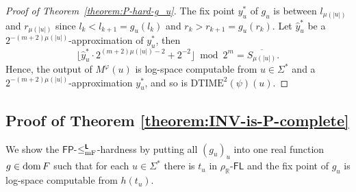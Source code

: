\documentclass[envcountsect,envcountsame,orivec,oribibl]{llncs}
\newcommand{\R}{\mathbb R}
\newcommand{\classonefont}[1]{\mathsf{#1}}
\newcommand{\classFL}{\classonefont{FL}}
\newcommand{\classFP}{\classonefont{FP}}
\newcommand{\classtwofont}[1]{\text{\bfseries \sffamily \upshape #1}}
\newcommand{\classLtwo}{\classtwofont{L}}
\newcommand{\rhoR}{\rho _\R}
\newcommand{\redmF}{\leq _{\mathrm{mF}}}
\newcommand{\redLmF}{\redmF ^{\classLtwo}}
\newcommand{\probDTIMEtwo}{\mathrm{DTIME}^2}
\newcommand{\dom}{\mathop{\rm dom}}
\begin{document}
\begin{proof}[Proof of Theorem~\ref{theorem:P-hard-g_u}]
 The fix point $y^*_u$ of $g_u$ is between $l_{\mu(|u|)}$ and $r_{\mu(|u|)}$ 
 since $l_k < l_{k+1} = g_u(l_k)$ and $r_k > r_{k+1} = g_u(r_k)$.
 Let $\hat y^*_u$ be a $2^{-(m+2)\mu(|u|)}$-approximation of $y^*_u$, then
\begin{equation}
 \lfloor \hat y^*_u \cdot 2^{(m+2)\mu(|u|)-2} + 2^{-2}\rfloor  \bmod 2^m
  =
  \overline{S_{\mu(|u|)}}.
\end{equation}
 Hence, the output of $M^\varphi(u)$ is log-space computable from 
 $u \in \varSigma^*$ and a $2^{-(m+2)\mu(|u|)}$-approximation $y^*_u$, and so is
 $\probDTIMEtwo(\psi)(u)$.
\end{proof}


\subsection{Proof of Theorem \ref{theorem:INV-is-P-complete}}
\label{section:proofs-of-theorems}

We show the $\classFP$-$\redLmF$-hardness 
by putting all $(g_u)_u$ into one real function $g \in \dom F$
such that for each $u \in \varSigma^*$ there is 
$t_u$ in $\rhoR$-$\classFL$ 
and the fix point of $g_u$ is log-space computable from $h(t_u)$.
\end{document}
